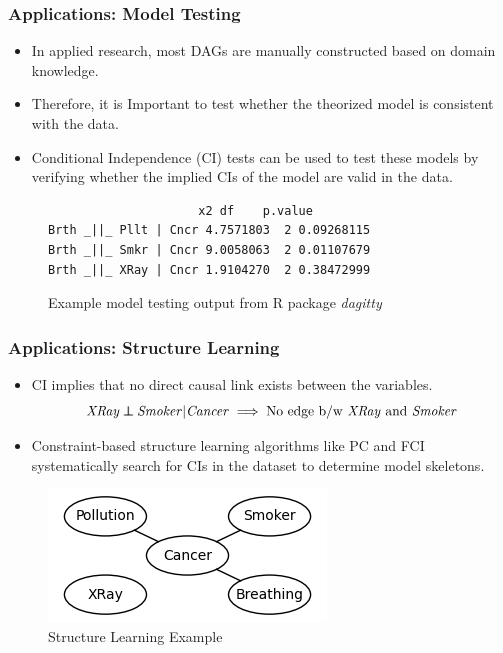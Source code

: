 \documentclass{beamer}
\def\ci{\perp\!\!\!\!\!\perp}
\begin{document}
\begin{frame}[fragile]
	\frametitle{Applications: Model Testing}
	\begin{itemize}
		\item In applied research, most DAGs are manually constructed
			based on domain knowledge.
		\item Therefore, it is Important to test whether the theorized model is
			consistent with the data.
		\item Conditional Independence (CI) tests can be used to test
			these models by verifying whether the implied CIs of the model
			are valid in the data.
	\end{itemize}
	\vspace{1em}

	\begin{figure}
		\centering
 		\begin{BVerbatim}
		             x2 df    p.value
Brth _||_ Pllt | Cncr 4.7571803  2 0.09268115
Brth _||_ Smkr | Cncr 9.0058063  2 0.01107679
Brth _||_ XRay | Cncr 1.9104270  2 0.38472999
 		\end{BVerbatim}
		\caption*{Example model testing output from R package \emph{dagitty}}
	\end{figure}
\end{frame}

\begin{frame}
	\frametitle{Applications: Structure Learning}
	\begin{itemize}
		\setlength\itemsep{1em}
		\item CI implies that no direct causal link exists between the variables.
			$$ \text{\emph{XRay}} \ci \text{\emph{Smoker}} | \text{\emph{Cancer}} \implies \text{No edge b/w \emph{XRay} and \emph{Smoker}} $$

		\item Constraint-based structure learning algorithms like PC
			and FCI systematically search for CIs in the dataset to 
			determine model skeletons.
	\end{itemize}
	\begin{figure}
		\centering
		\includegraphics[scale=0.6]{imgs/example_sl.png}
		\caption*{Structure Learning Example}
	\end{figure}
\end{frame}
\end{document}
